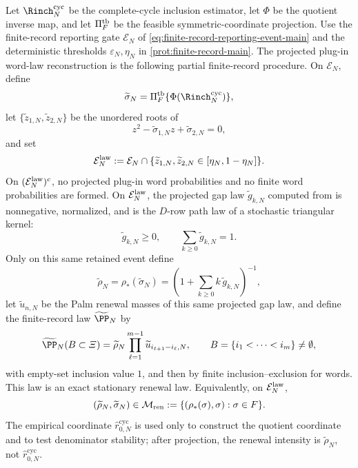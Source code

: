 \begin{proposition}\label{prop:finite-record-complete-law-renewal-consistency-main}
Let \(\Rinch_N^{\mathrm{cyc}}\) be the complete-cycle inclusion estimator,
let \(\Phi\) be the quotient inverse map, and let
\(\Pi_F^{\rm tb}\) be the feasible symmetric-coordinate projection.  Use the
finite-record reporting gate \(\mathcal E_N\) of
\eqref{eq:finite-record-reporting-event-main} and the deterministic thresholds
\(\varepsilon_N,\eta_N\) in \eqref{prot:finite-record-main}.  The projected
plug-in word-law reconstruction is the following partial finite-record
procedure.  On
\(\mathcal E_N\), define
\[
\widetilde\sigma_N
=\Pi_F^{\rm tb}\{\Phi(\Rinch_N^{\mathrm{cyc}})\},
\]
let \(\{ \widetilde z_{1,N},\widetilde z_{2,N}\}\) be the unordered roots of
\[
z^2-\widetilde\sigma_{1,N}z+\widetilde\sigma_{2,N}=0,
\]
and set
\begin{equation}\label{eq:complete-law-retained-event-main}
\mathcal E_N^{\rm law}
:=\mathcal E_N\cap
\{\widetilde z_{1,N},\widetilde z_{2,N}\in[\eta_N,1-\eta_N]\}.
\end{equation}
On \((\mathcal E_N^{\rm law})^c\), no projected plug-in word probabilities and
no finite word probabilities are formed.  On \(\mathcal E_N^{\rm law}\), the
projected gap law
\(\widetilde g_{k,N}\) computed from
 is nonnegative,
normalized, and is the \(D\)-row path law of a stochastic triangular kernel:
\[
\widetilde g_{k,N}\ge0,\qquad
\sum_{k\ge0}\widetilde g_{k,N}=1 .
\]
Only on this same retained event define
\[
\widetilde\rho_N
=\rho_*(\widetilde\sigma_N)
=\left(1+\sum_{k\ge0}k\,\widetilde g_{k,N}\right)^{-1},
\]
let \(\widetilde u_{n,N}\) be the Palm renewal masses of this same projected
gap law, and define the finite-record law \(\widetilde\PP_N\) by
\begin{equation}\label{eq:finite-record-renewal-consistent-inclusions-main}
\widetilde\PP_N(B\subset\varXi)
=\widetilde\rho_N
 \prod_{\ell=1}^{m-1}\widetilde u_{i_{\ell+1}-i_\ell,N},
\qquad B=\{i_1<\cdots<i_m\}\ne\emptyset,
\end{equation}
with empty-set inclusion value \(1\), and then by finite inclusion--exclusion
for words.  This law is an exact stationary renewal law.  Equivalently, on
\(\mathcal E_N^{\rm law}\),
\[
(\widetilde\rho_N,\widetilde\sigma_N)\in
\mathcal M_{\rm ren}
:=\{(\rho_*(\sigma),\sigma):\sigma\in F\}.
\]
The empirical coordinate \(\widehat r_{0,N}^{\mathrm{cyc}}\) is used only to
construct the quotient coordinate and to test denominator stability; after
projection, the renewal intensity is \(\widetilde\rho_N\), not
\(\widehat r_{0,N}^{\mathrm{cyc}}\).


\end{proposition}
